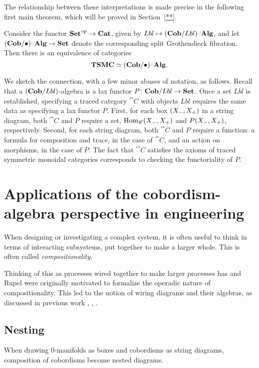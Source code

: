 The relationship between these interpretations is made precise in the following first main theorem, which will be proved in Section~\ref{**}.
\begin{theorem}
Consider the functor ${\mathbf{Set}}^{\text{op}}\to\mathbf{Cat}$, given by $Lbl\mapsto(\mathbf{Cob}/Lbl){\text \textendash}\mathbf{Alg}$, and let $(\mathbf{Cob}/\bullet){\text \textendash}\mathbf{Alg}\to\mathbf{Set}$ denote the corresponding split Grothendieck fibration. Then there is an equivalence of categories
$$\mathbf{TSMC}\simeq(\mathbf{Cob}/\bullet){\text \textendash}\mathbf{Alg}.$$
\end{theorem}

We sketch the connection, with a few minor abuses of notation, as follows. Recall that a $(\mathbf{Cob}/Lbl)$-algebra is a lax functor $P\colon\mathbf{Cob}/Lbl\to\mathbf{Set}$. Once a set $Lbl$ is established, specifying a traced category $\cat{C}$ with objects $Lbl$ requires the same data as specifying a lax functor $P$. First, for each box $({X_-},{X_+})$ in a string diagram, both $\cat{C}$ and $P$ require a set, $\operatorname{Hom}_{\mathscr{C}}({X_-},{X_+})$ and $P({X_-},{X_+})$, respectively.  Second, for each string diagram, both $\cat{C}$ and $P$ require a function: a formula for composition and trace, in the case of $\cat{C}$, and an action on morphisms, in the case of $P$. The fact that $\cat{C}$ satisfies the axioms of traced symmetric monoidal categories corresponds to checking the functoriality of $P$.

\section{Applications of the cobordism-algebra perspective in engineering}

When designing or investigating a complex system, it is often useful to think in terms of interacting subsystems, put together to make a larger whole. This is often called \emph{compositionality}.

Thinking of this as processes wired together to make larger processes has and Rupel were originally motivated to formalize the operadic nature of compositionality. This led to the notion of wiring diagrams and their algebras, as discussed in previous work \cite{Spivak}, \cite{Rupel-Spivak}, \cite{Vagner-Spivak-Lerman}. 
 

\subsection{Nesting}
When drawing 0-manifolds as boxes and cobordisms as string diagrams, composition of cobordisms become nested diagrams.

